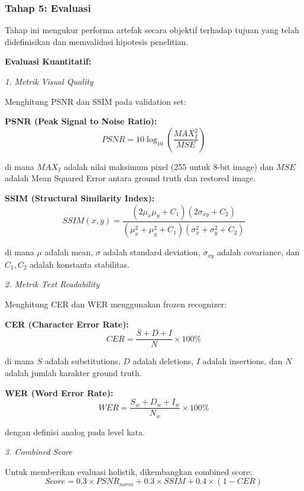 \documentclass[12pt,a4paper]{article}
\begin{document}
\subsubsection{Tahap 5: Evaluasi}
\label{subsubsec:evaluasi}

Tahap ini mengukur performa artefak secara objektif terhadap tujuan yang telah didefinisikan dan memvalidasi hipotesis penelitian.

\textbf{Evaluasi Kuantitatif:}

\textit{1. Metrik Visual Quality}

Menghitung PSNR dan SSIM pada validation set:

\textbf{PSNR (Peak Signal to Noise Ratio):}
\begin{equation}
PSNR = 10 \log_{10} \left( \frac{MAX_I^2}{MSE} \right)
\end{equation}

di mana $MAX_I$ adalah nilai maksimum pixel (255 untuk 8-bit image) dan $MSE$ adalah Mean Squared Error antara ground truth dan restored image.

\textbf{SSIM (Structural Similarity Index):}
\begin{equation}
SSIM(x, y) = \frac{(2\mu_x\mu_y + C_1)(2\sigma_{xy} + C_2)}{(\mu_x^2 + \mu_y^2 + C_1)(\sigma_x^2 + \sigma_y^2 + C_2)}
\end{equation}

di mana $\mu$ adalah mean, $\sigma$ adalah standard deviation, $\sigma_{xy}$ adalah covariance, dan $C_1, C_2$ adalah konstanta stabilitas.

\textit{2. Metrik Text Readability}

Menghitung CER dan WER menggunakan frozen recognizer:

\textbf{CER (Character Error Rate):}
\begin{equation}
CER = \frac{S + D + I}{N} \times 100\%
\end{equation}

di mana $S$ adalah substitutions, $D$ adalah deletions, $I$ adalah insertions, dan $N$ adalah jumlah karakter ground truth.

\textbf{WER (Word Error Rate):}
\begin{equation}
WER = \frac{S_w + D_w + I_w}{N_w} \times 100\%
\end{equation}

dengan definisi analog pada level kata.

\textit{3. Combined Score}

Untuk memberikan evaluasi holistik, dikembangkan combined score:
\begin{equation}
Score = 0.3 \times PSNR_{norm} + 0.3 \times SSIM + 0.4 \times (1 - CER)
\end{equation}
\end{document}
